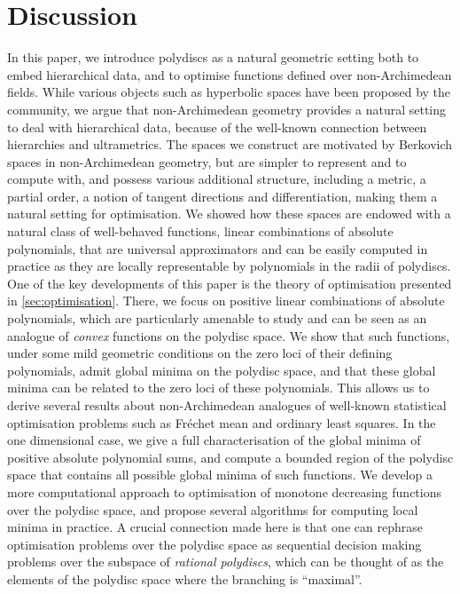 \documentclass[10pt]{article}
\theoremstyle{definition}
\begin{document}


\section{Discussion}
\label{sec:discussion}
In this paper, we introduce polydiscs as a natural geometric setting both to embed hierarchical data, and to optimise functions defined over non-Archimedean fields. 
While various objects such as hyperbolic spaces have been proposed by the community, we argue that non-Archimedean geometry provides a natural setting to deal with hierarchical data, because of the well-known connection between hierarchies and ultrametrics.
The spaces we construct are motivated by Berkovich spaces in non-Archimedean geometry, but are simpler to represent and to compute with, and possess various additional structure, including a metric, a partial order, a notion of tangent directions and differentiation, making them a natural setting for optimisation.
We showed how these spaces are endowed with a natural class of well-behaved functions, linear combinations of absolute polynomials, that are universal approximators and can be easily computed in practice as they are locally representable by polynomials in the radii of polydiscs.
One of the key developments of this paper is the theory of optimisation presented in \cref{sec:optimisation}. 
There, we focus on positive linear combinations of absolute polynomials, which are particularly amenable to study and can be seen as an analogue of \emph{convex} functions on the polydisc space.
We show that such functions, under some mild geometric conditions on the zero loci of their defining polynomials, admit global minima on the polydisc space, and that these global minima can be related to the zero loci of these polynomials.
This allows us to derive several results about non-Archimedean analogues of well-known statistical optimisation problems such as Fr\'echet mean and ordinary least squares.
In the one dimensional case, we give a full characterisation of the global minima of positive absolute polynomial sums, and compute a bounded region of the polydisc space that contains all possible global minima of such functions.
We develop a more computational approach to optimisation of monotone decreasing functions over the polydisc space, and propose several algorithms for computing local minima in practice.
A crucial connection made here is that one can rephrase optimisation problems over the polydisc space as sequential decision making problems over the subspace of \emph{rational polydiscs}, which can be thought of as the elements of the polydisc space where the branching is ``maximal''.
\end{document}
